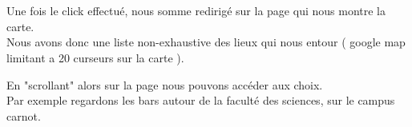 \documentclass[10pt,a4paper, landscape]{report}
\begin{document}
{{\newpage
\section{}

Une fois le click effectué, nous somme redirigé sur la page qui nous montre la carte. \\
Nous avons donc une liste non-exhaustive des lieux qui nous entour ( google map limitant a 20 curseurs sur la carte ). \\
{%
\setlength{\fboxsep}{0pt}%
\setlength{\fboxrule}{2pt}%
%

\newpage
En "scrollant" alors sur la page nous pouvons accéder aux choix. \\
Par exemple regardons les bars autour de la faculté des sciences, sur le campus carnot. \\
{%
\setlength{\fboxsep}{0pt}%
\setlength{\fboxrule}{2pt}%
%

\newpage
\section{}

}}}}
\end{document}
